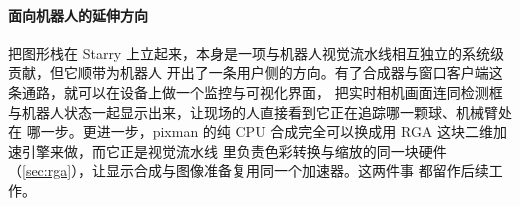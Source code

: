 \paragraph{面向机器人的延伸方向}
把图形栈在 Starry 上立起来，本身是一项与机器人视觉流水线相互独立的系统级贡献，但它顺带为机器人
开出了一条用户侧的方向。有了合成器与窗口客户端这条通路，就可以在设备上做一个监控与可视化界面，
把实时相机画面连同检测框与机器人状态一起显示出来，让现场的人直接看到它正在追踪哪一颗球、机械臂处在
哪一步。更进一步，pixman 的纯 CPU 合成完全可以换成用 RGA 这块二维加速引擎来做，而它正是视觉流水线
里负责色彩转换与缩放的同一块硬件（\ref{sec:rga}），让显示合成与图像准备复用同一个加速器。这两件事
都留作后续工作。

